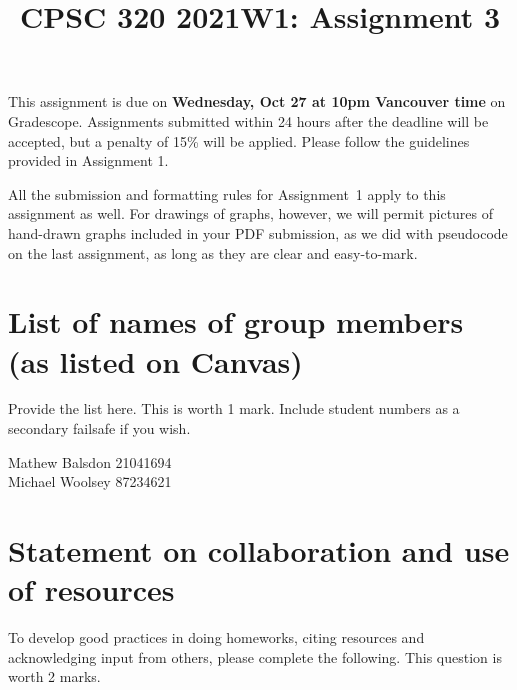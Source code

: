 \documentclass[11pt]{article}
\author{}
\date{}
\begin{document}
\title{CPSC 320 2021W1: Assignment 3}

\maketitle
\vspace{-0.5in}

This assignment is due on \textbf{Wednesday, Oct 27 at 10pm Vancouver time} on Gradescope. Assignments submitted within 24 hours after the deadline will be accepted, but a penalty of 15\% will be applied. Please follow the guidelines provided in Assignment 1.

All the submission and formatting rules for Assignment~1 apply to
this assignment as well.  For drawings of graphs, however, we will permit
pictures of hand-drawn graphs included in your PDF submission, as we did
with pseudocode on the last assignment, as long as they are clear and
easy-to-mark.

\section{List of names of group members (as listed on Canvas)}

Provide the list here. This is worth 1 mark. Include student numbers
as a secondary failsafe if you wish.

\begin{soln}
Mathew Balsdon 21041694 \\
Michael Woolsey 87234621
\end{soln}

\section{Statement on collaboration and use of resources}
To develop good practices in doing homeworks,
citing resources and acknowledging input from others, please complete the following.
This question is worth 2 marks.
\end{document}
